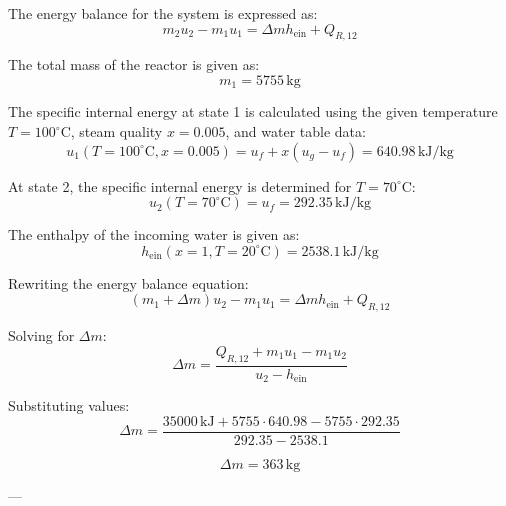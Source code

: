 The energy balance for the system is expressed as:  
\[
m_2 u_2 - m_1 u_1 = \Delta m h_{\text{ein}} + Q_{R,12}
\]  

The total mass of the reactor is given as:  
\[
m_1 = 5755 \, \text{kg}
\]  

The specific internal energy at state 1 is calculated using the given temperature \( T = 100^\circ\text{C} \), steam quality \( x = 0.005 \), and water table data:  
\[
u_1(T=100^\circ\text{C}, x=0.005) = u_f + x (u_g - u_f) = 640.98 \, \text{kJ/kg}
\]  

At state 2, the specific internal energy is determined for \( T = 70^\circ\text{C} \):  
\[
u_2(T=70^\circ\text{C}) = u_f = 292.35 \, \text{kJ/kg}
\]  

The enthalpy of the incoming water is given as:  
\[
h_{\text{ein}}(x=1, T=20^\circ\text{C}) = 2538.1 \, \text{kJ/kg}
\]  

Rewriting the energy balance equation:  
\[
(m_1 + \Delta m) u_2 - m_1 u_1 = \Delta m h_{\text{ein}} + Q_{R,12}
\]  

Solving for \( \Delta m \):  
\[
\Delta m = \frac{Q_{R,12} + m_1 u_1 - m_1 u_2}{u_2 - h_{\text{ein}}}
\]  

Substituting values:  
\[
\Delta m = \frac{35000 \, \text{kJ} + 5755 \cdot 640.98 - 5755 \cdot 292.35}{292.35 - 2538.1}
\]  

\[
\Delta m = 363 \, \text{kg}
\]  

---